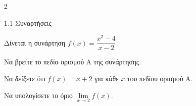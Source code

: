 \begin{ylh}{2}
\item 1.1 Συναρτήσεις
\end{ylh}
Δίνεται η συνάρτηση $f(x) = \dfrac{x^2-4}{x-2}$.
\begin{alist}
    \item Να βρείτε το πεδίο ορισμού Α της συνάρτησης. 
    \item Να δείξετε ότι $f(x) = x + 2$ για κάθε $x$ του πεδίου ορισμού Α. 
    \item Να υπολογίσετε το όριο $\lim\limits_{x \to 2} f(x)$. 
\end{alist}

